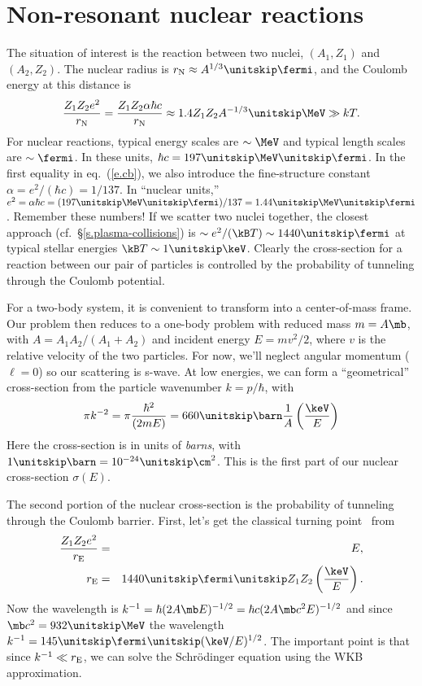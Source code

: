 \section{Non-resonant nuclear reactions}

The situation of interest is the reaction between two nuclei, $(A_{1},Z_{1})$ and $(A_{2},Z_{2})$.  The nuclear radius is $\rn\approx  A^{1/3}\nsp\fermi$, and the Coulomb energy at this distance is
\begin{equation}\label{e.cb}
\frac{Z_{1}Z_{2}e^{2}}{\rn} = \frac{Z_{1}Z_{2}\alpha \hbar c}{ \rn} \approx 1.4 Z_{1}Z_{2}A^{-1/3}\nsp\MeV\gg kT.
\end{equation}
For nuclear reactions, typical energy scales  are $\sim\MeV$ and typical length scales are $\sim\fermi$.  In these units, $\hbar c = 197 \nsp\MeV\usp\fermi$.  In the first equality in eq.~(\ref{e.cb}), we also introduce the fine-structure constant $\alpha = e^{2}/(\hbar c) = 1/137$. In ``nuclear units,'' $e^{2} = \alpha \hbar c = (197\nsp\MeV\usp\fermi)/137 = 1.44\nsp\MeV\usp\fermi$. Remember these numbers!  If we scatter two nuclei together, the closest approach (cf.~\S\ref{s.plasma-collisions}) is $\sim e^{2}/(\kB T) \sim 1440\nsp\fermi$ at typical stellar energies $\kB T \sim 1\nsp\keV$.
Clearly the cross-section for a reaction between our pair of particles is controlled by the probability of tunneling through the Coulomb potential.

For a two-body system, it is convenient to transform into a center-of-mass frame.  Our problem then reduces to a one-body problem with reduced mass $m = A\mb$, with $A=A_{1}A_{2}/(A_{1}+A_{2})$ and incident energy $E = m v^{2}/2$, where $v$ is the relative velocity of the two particles.  For now, we'll neglect angular momentum ($\ell = 0$) so our scattering is s-wave.
At low energies, we can form a ``geometrical'' cross-section from the particle wavenumber $k = p/\hbar$, with
\begin{equation}\label{e.geo}
\pi k^{-2} = \pi\frac{\hbar^{2}}{(2mE)} = 660\nsp\barn\frac{1}{A}\left(\frac{\keV}{E}\right)
\end{equation}
Here the cross-section is in units of \emph{barns}, with $1\nsp\barn = 10^{-24}\nsp\cm^{2}$.  This is the first part of our nuclear cross-section $\sigma(E)$. 

The second portion of the nuclear cross-section is the probability of tunneling through the Coulomb barrier.  First, let's get the classical turning point \re\ from
\begin{eqnarray}
\frac{Z_{1}Z_{2}e^{2}}{\re} &=& E,\nonumber\\
\re &=& 1440\nsp\fermi\nsp Z_{1}Z_{2}\left(\frac{\keV}{E}\right).
\end{eqnarray}
Now the wavelength is $k^{-1} = \hbar(2A\mb E)^{-1/2} = \hbar c (2A\mb c^{2} E)^{-1/2}$ and since $\mb c^{2} = 932\nsp\MeV$ the wavelength $k^{-1} = 145\nsp\fermi\usp(\keV/E)^{1/2}$. The important point is that since $k^{-1}\ll r_{\mathrm{E}}$, we can solve the Schr\"odinger equation using the WKB approximation.

